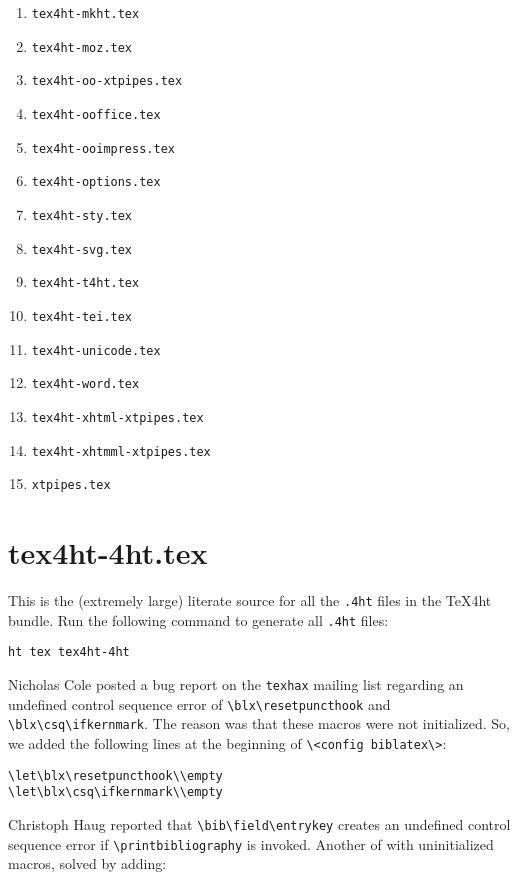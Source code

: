 \begin{enumerate}
\item \Verb=tex4ht-mkht.tex=
\item \Verb=tex4ht-moz.tex=
\item \Verb=tex4ht-oo-xtpipes.tex=
\item \Verb=tex4ht-ooffice.tex=
\item \Verb=tex4ht-ooimpress.tex=
\item \Verb=tex4ht-options.tex=
\item \Verb=tex4ht-sty.tex=
\item \Verb=tex4ht-svg.tex=
\item \Verb=tex4ht-t4ht.tex=
\item \Verb=tex4ht-tei.tex=
\item \Verb=tex4ht-unicode.tex=
\item \Verb=tex4ht-word.tex=
\item \Verb=tex4ht-xhtml-xtpipes.tex=
\item \Verb=tex4ht-xhtmml-xtpipes.tex=
\item \Verb=xtpipes.tex=
\end{enumerate}

\section{tex4ht-4ht.tex}

This is the (extremely large) literate source for all the \Verb=.4ht=
files in the \TeX{}4ht bundle.  Run the following command to generate
all \Verb=.4ht= files:

\begin{verbatim}
ht tex tex4ht-4ht
\end{verbatim}

Nicholas Cole posted a bug report on the \Verb=texhax= mailing list
regarding an undefined control sequence error of
\verb|\blx\resetpuncthook| and \verb|\blx\csq\ifkernmark|.  The
reason was that these macros were not initialized.  So, we added the
following lines at the beginning of \Verb=\<config biblatex\>=:

\begin{verbatim}
\let\blx\resetpuncthook\\empty
\let\blx\csq\ifkernmark\\empty
\end{verbatim}

Christoph Haug reported that \verb|\bib\field\entrykey| creates an
undefined control sequence error if \Verb=\printbibliography= is
invoked.  Another of with uninitialized macros, solved by adding:

